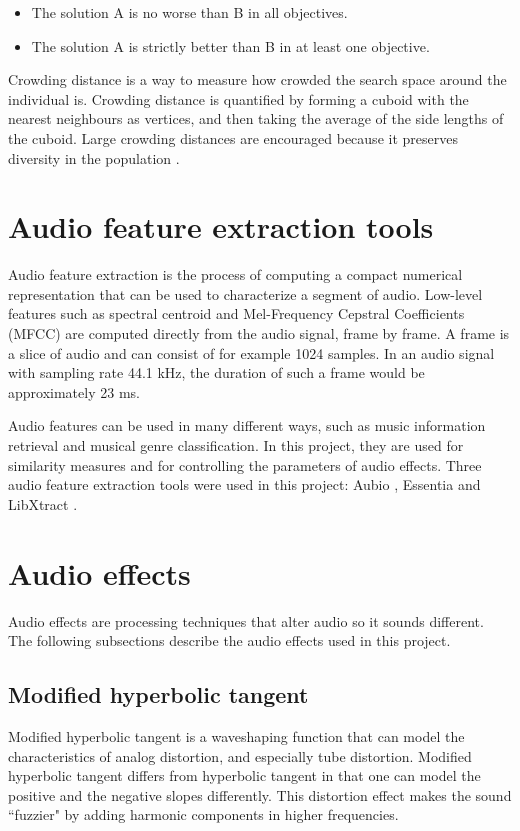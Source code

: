 \begin{itemize}  
\item The solution A is no worse than B in all objectives.
\item The solution A is strictly better than B in at least one objective.
\end{itemize}

Crowding distance is a way to measure how crowded the search space around the individual is. Crowding distance is quantified by forming a cuboid with the nearest neighbours as vertices, and then taking the average of the side lengths of the cuboid. Large crowding distances are encouraged because it preserves diversity in the population \citep{nsga2}.

\section{Audio feature extraction tools}
Audio feature extraction is the process of computing a compact numerical representation that can be used to characterize a segment of audio. Low-level features such as spectral centroid and Mel-Frequency Cepstral Coefficients (MFCC) \citep{mermelstein1976, logan2000} are computed directly from the audio signal, frame by frame. A frame is a slice of audio and can consist of for example 1024 samples. In an audio signal with sampling rate 44.1 kHz, the duration of such a frame would be approximately 23 ms.

Audio features can be used in many different ways, such as music information retrieval and musical genre classification. In this project, they are used for similarity measures and for controlling the parameters of audio effects. Three audio feature extraction tools were used in this project: Aubio \citep{brossier2003aubio}, Essentia \citep{bogdanov2013essentia} and LibXtract \citep{bullock2007libxtract}.

\section{Audio effects}
Audio effects are processing techniques that alter audio so it sounds different. The following subsections describe the audio effects used in this project.

\subsection{Modified hyperbolic tangent}
Modified hyperbolic tangent is a waveshaping function that can model the characteristics of analog distortion, and especially tube distortion. Modified hyperbolic tangent differs from hyperbolic tangent in that one can model the positive and the negative slopes differently. This distortion effect makes the sound ``fuzzier" by adding harmonic components in higher frequencies.

